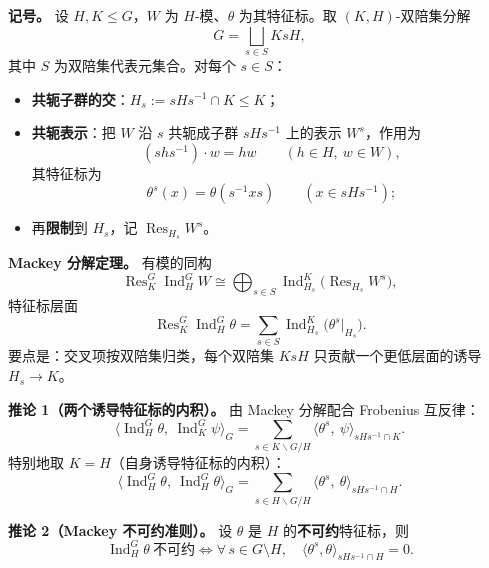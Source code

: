 \documentclass[a4paper]{ctexart}
\theoremstyle{definition}
\theoremstyle{analysis}
\theoremstyle{plain}
\begin{document}
\medskip

\textbf{记号。} 设 \(H,K\le G\)，\(W\) 为 \(H\)-模、\(\theta\) 为其特征标。取 \((K,H)\)-双陪集分解
\[
  G=\bigsqcup_{s\in S}KsH,
\]
其中 \(S\) 为双陪集代表元集合。对每个 \(s\in S\)：

\begin{itemize}
  \item \textbf{共轭子群的交}：\(H_s:=sHs^{-1}\cap K\le K\)；
  \item \textbf{共轭表示}：把 \(W\) 沿 \(s\) 共轭成子群 \(sHs^{-1}\) 上的表示 \(W^s\)，作用为
  \[
    (shs^{-1})\cdot w=hw\qquad (h\in H,\ w\in W),
  \]
  其特征标为
  \[
    \theta^s(x)=\theta(s^{-1}xs)\qquad (x\in sHs^{-1});
  \]
  \item 再\textbf{限制}到 \(H_s\)，记 \(\operatorname{Res}_{H_s}W^s\)。
\end{itemize}

\medskip

\textbf{Mackey 分解定理。} 有模的同构
\[
  \operatorname{Res}_K^G\operatorname{Ind}_H^G W
  \cong
  \bigoplus_{s\in S}\operatorname{Ind}_{H_s}^K\bigl(\operatorname{Res}_{H_s}W^s\bigr),
\]
特征标层面
\[
  \operatorname{Res}_K^G\operatorname{Ind}_H^G\theta
  =
  \sum_{s\in S}\operatorname{Ind}_{H_s}^K\bigl(\theta^s\big|_{H_s}\bigr).
\]
要点是：交叉项按双陪集归类，每个双陪集 \(KsH\) 只贡献一个更低层面的诱导 \(H_s\to K\)。

\medskip

\textbf{推论 1（两个诱导特征标的内积）。} 由 Mackey 分解配合 Frobenius 互反律：
\[
  \langle \operatorname{Ind}_H^G\theta,\ \operatorname{Ind}_K^G\psi\rangle_G
  =
  \sum_{s\in K\backslash G/H}
  \langle \theta^s,\ \psi\rangle_{sHs^{-1}\cap K}.
\]
特别地取 \(K=H\)（自身诱导特征标的内积）：
\[
  \langle \operatorname{Ind}_H^G\theta,\ \operatorname{Ind}_H^G\theta\rangle_G
  =
  \sum_{s\in H\backslash G/H}
  \langle \theta^s,\ \theta\rangle_{sHs^{-1}\cap H}.
\]

\medskip

\textbf{推论 2（Mackey 不可约准则）。} 设 \(\theta\) 是 \(H\) 的\textbf{不可约}特征标，则
\[
  \operatorname{Ind}_H^G\theta\ \text{不可约}
  \iff
  \forall\, s\in G\setminus H,\quad
  \langle \theta^s,\theta\rangle_{sHs^{-1}\cap H}=0.
\]
\end{document}
